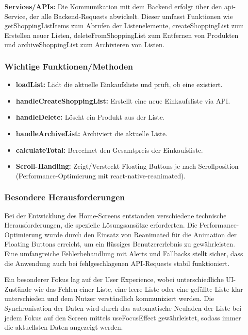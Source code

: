 \documentclass[12pt, a4paper]{report} %
\begin{document}
\noindent\textbf{Services/APIs:}
Die Kommunikation mit dem Backend erfolgt über den api-Service, der alle Backend-Requests abwickelt. Dieser umfasst Funktionen wie getShoppingListItems zum Abrufen der Listenelemente, createShoppingList zum Erstellen neuer Listen, deleteFromShoppingList zum Entfernen von Produkten und archiveShoppingList zum Archivieren von Listen.

\subsubsection{Wichtige Funktionen/Methoden}
\begin{itemize}
    \item \textbf{loadList:} Lädt die aktuelle Einkaufsliste und prüft, ob eine existiert.
    \item \textbf{handleCreateShoppingList:} Erstellt eine neue Einkaufsliste via API.
    \item \textbf{handleDelete:} Löscht ein Produkt aus der Liste.
    \item \textbf{handleArchiveList:} Archiviert die aktuelle Liste.
    \item \textbf{calculateTotal:} Berechnet den Gesamtpreis der Einkaufsliste.
    \item \textbf{Scroll-Handling:} Zeigt/Versteckt Floating Buttons je nach Scrollposition (Performance-Optimierung mit react-native-reanimated).
\end{itemize}

\subsubsection{Besondere Herausforderungen}
Bei der Entwicklung des Home-Screens entstanden verschiedene technische Herausforderungen, die spezielle Lösungsansätze erforderten. Die Performance-Optimierung wurde durch den Einsatz von Reanimated für die Animation der Floating Buttons erreicht, um ein flüssiges Benutzererlebnis zu gewährleisten. Eine umfangreiche Fehlerbehandlung mit Alerts und Fallbacks stellt sicher, dass die Anwendung auch bei fehlgeschlagenen API-Requests stabil funktioniert.

Ein besonderer Fokus lag auf der User Experience, wobei unterschiedliche UI-Zustände wie das Fehlen einer Liste, eine leere Liste oder eine gefüllte Liste klar unterschieden und dem Nutzer verständlich kommuniziert werden. Die Synchronisation der Daten wird durch das automatische Neuladen der Liste bei jedem Fokus auf den Screen mittels useFocusEffect gewährleistet, sodass immer die aktuellsten Daten angezeigt werden.
\end{document}
